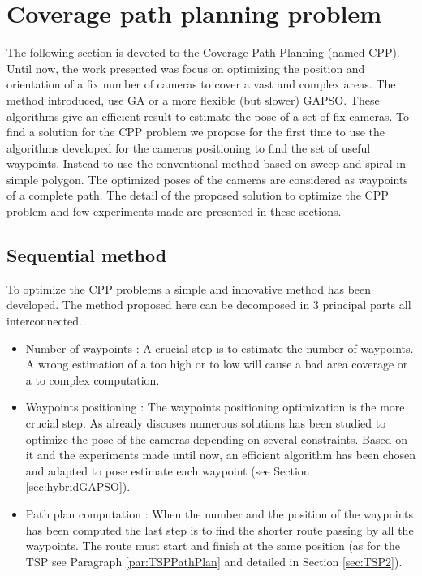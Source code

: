 \chapter{Coverage path planning problem} 


\minitoc

The following section is devoted to the Coverage Path Planning (named CPP). Until now, the work presented was focus on optimizing the position and orientation of a fix number of cameras to cover a vast and complex areas. 
The method introduced, use GA or a more flexible (but slower) GAPSO. These algorithms give an efficient result to estimate the pose of a set of fix cameras. To find a solution for the CPP problem we propose for the first time to use the algorithms developed for the cameras positioning to find the set of useful waypoints. Instead to use the conventional method based on sweep and spiral in simple polygon. The optimized poses of the cameras are considered as waypoints of a complete path. 
The detail of the proposed solution to optimize the CPP problem and few experiments made are presented in these sections.
 

\section{Sequential method} \label{sec:CPPsequantielMethod}
To optimize the CPP problems a simple and innovative method has been developed. The method proposed here can be decomposed in 3 principal parts all interconnected. 
\begin{itemize}
	\item Number of waypoints : 
	A crucial step is to estimate the number of waypoints. A wrong estimation of a too high or to low will cause a bad area coverage or a to complex computation.
	\item Waypoints positioning : 
	The waypoints positioning optimization is the more crucial step. As already discuses numerous solutions has been studied to optimize the pose of the cameras depending on several constraints. Based on it and the experiments made until now, an efficient algorithm has been chosen and adapted to pose estimate each waypoint (see Section  \ref{sec:hybridGAPSO}). 
	\item  Path plan computation : 
	 When the number and the position of the waypoints has been computed the last step is to find the shorter route  passing by all the waypoints. The route must start and finish at the same position (as for the TSP see Paragraph \ref{par:TSPPathPlan} and detailed in Section \ref{sec:TSP2}).
	
\end{itemize}

